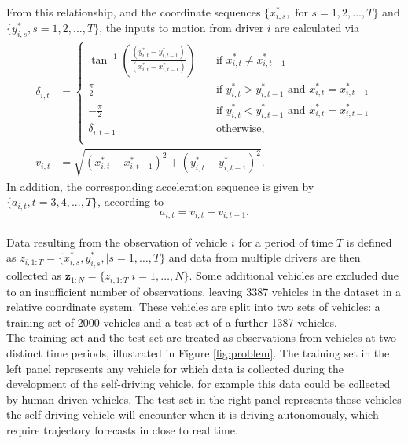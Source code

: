 \documentclass[12pt,a4paper]{article}\usepackage[]{graphicx}\usepackage[]{color}
\begin{document}
From this relationship, and the coordinate sequences $\{x^*_{i, s}, \mbox{ for }s=1,2,...,T\}$ and $\{y^*_{i, s}, s=1,2,...,T\}$, the inputs to motion from driver $i$ are calculated via
\begin{align}
\delta_{i, t} &= 
     \begin{cases}
       \tan^{-1}\left(\frac{(y^*_{i, t} - y^*_{i, t-1})}{(x^*_{i, t} - x^*_{i, t-1})} \right)  &\quad\text{if }x^*_{i, t} \neq x^*_{i, t-1} \\
       \frac{\pi}{2} &\quad\text{if } y^*_{i, t} > y^*_{i, t-1} \mbox{ and } x^*_{i, t} = x^*_{i, t-1} \\
       -\frac{\pi}{2} &\quad\text{if } y^*_{i, t} < y^*_{i, t-1} \mbox{ and } x^*_{i, t} = x^*_{i, t-1} \\
       \delta_{i, t-1} &\quad\text{otherwise,} \\ 
     \end{cases} \label{dEq} \\
v_{i, t} &= \sqrt{(x^*_{i, t} - x^*_{i, t-1})^2 + (y^*_{i, t} - y^*_{i, t-1})^2} \label{vEq}.
\end{align}
In addition, the corresponding acceleration sequence is given by $\{a_{i, t},t=3,4,...,T\}$, according to
\begin{equation}
\label{aEq}
a_{i, t} = v_{i, t} - v_{i, t-1}. 
\end{equation}
\\

Data resulting from the observation of vehicle $i$ for a period of time $T$ is defined as $z_{i, 1:T} = \{x^*_{i, s}, y^*_{i, s}, | s = 1, \dots, T\}$ and data from multiple drivers are then collected as $\mathbf{z}_{1:N} = \{z_{i, 1:T} | i = 1, \dots, N\}$. Some additional vehicles are excluded due to an insufficient number of observations, leaving 3387 vehicles in the dataset in a relative coordinate system. These vehicles are split into two sets of vehicles: a training set of 2000 vehicles and a test set of a further 1387 vehicles.
\\

The training set and the test set are treated as observations from vehicles at two distinct time periods, illustrated in Figure \ref{fig:problem}. The training set in the left panel represents any vehicle for which data is collected during the development of the self-driving vehicle, for example this data could be collected by human driven vehicles. The test set in the right panel represents those vehicles the self-driving vehicle will encounter when it is driving autonomously, which require trajectory forecasts in close to real time.
\end{document}
